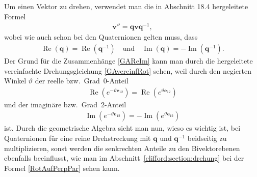 Um einen Vektor zu drehen, verwendet man die in Abschnitt 18.4 hergeleitete Formel 
\begin{align} \label{QuatRotGA}
\mathbf{v}'' = \mathbf{qvq}^{-1},
\end{align}
wobei wie auch schon bei den Quaternionen gelten muss, dass
\begin{align} \label{GAReIm}
\operatorname{Re}(\mathbf{q}) = \operatorname{Re}(\mathbf{q}^{-1}) \quad\text{und}\quad \operatorname{Im}(\mathbf{q}) = -\operatorname{Im}(\mathbf{q}^{-1}).
\end{align}
Der Grund für die Zusammenhänge \eqref{GAReIm} kann man durch die hergeleitete vereinfachte Drehungsgleichung \eqref{GAvereinfRot} sehen, weil durch den negierten Winkel $\vartheta$ der reelle bzw.~Grad~0-Anteil
\begin{align*}
\operatorname{Re}(e^{-\vartheta \mathbf{e}_{12}}) = \operatorname{Re}(e^{\vartheta \mathbf{e}_{12}})
\end{align*}
und der imaginäre bzw.~Grad~2-Anteil
\begin{align*}
\operatorname{Im}(e^{-\vartheta \mathbf{e}_{12}}) = -\operatorname{Im}(e^{\vartheta \mathbf{e}_{12}})
\end{align*}
ist.
Durch die geometrische Algebra sieht man nun, wieso es wichtig ist, bei Quaternionen für eine reine Drehstreckung mit $\mathbf{q}$ und $\mathbf{q}^{-1}$ beidseitig zu multiplizieren, sonst werden die senkrechten Anteile zu den Bivektorebenen ebenfalls beeinflusst, wie man im Abschnitt~\ref{clifford:section:drehung} bei der Formel \eqref{RotAufPerpPar} sehen kann.
